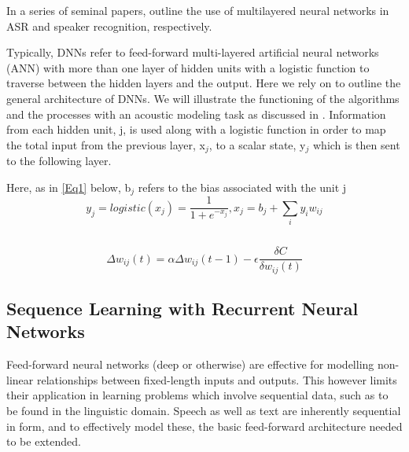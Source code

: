 \documentclass{article}[12pt]
\begin{document}
In a series of seminal papers, \cite{bengio1989_acm,bengio1989} outline the use of multilayered neural networks in ASR and speaker recognition, respectively.

Typically, DNNs refer to feed-forward multi-layered artificial neural networks (ANN) with more than one layer of hidden units with a logistic function to traverse between the hidden layers and the output. Here we rely on \cite{hinton2012} to outline the general architecture of DNNs. We will illustrate the functioning of the algorithms and the processes with an acoustic modeling task as discussed in \cite{hinton2012}. Information from each hidden unit, j, is used along with a logistic function in order to map the total input from the previous layer, x$_j$, to a scalar state, y$_j$ which is then sent to the following layer.

Here, as in \ref{Eq1} below, b$_j$ refers to the bias associated with the unit j
\begin{equation}
y_{j}=logistic(x_{j})=\frac{1}{1+e^{-x_{j}}}, x_{j} = b_{j} + \sum_{i}y_{i}w_{ij}
\label{Eq1}
\end{equation}

\begin{equation}
\label{Eq2}
\end{equation}

\begin{equation}
\label{Eq3}
\end{equation}
\begin{equation}
\Delta w_{ij}(t)=\alpha\Delta w_{ij}(t-1) - \epsilon \frac{\delta C}{\delta w_{ij}(t)}
\label{Eq4}
\end{equation}

\subsection{Sequence Learning with Recurrent Neural Networks}
Feed-forward neural networks (deep or otherwise) are effective for modelling non-linear relationships between fixed-length inputs and outputs. This however limits their application in learning problems which involve sequential data, such as to be found in the linguistic domain. Speech as well as text are inherently sequential in form, and to effectively model these, the basic feed-forward architecture needed to be extended.
\end{document}
